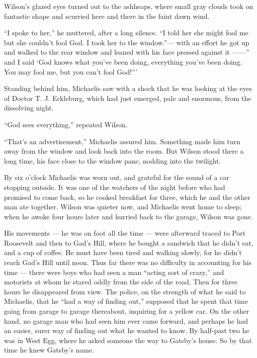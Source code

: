 \documentclass{znotebook}
\begin{document}
Wilson's glazed eyes turned out to the ashheaps, where small gray clouds took on fantastic shape and scurried here and there in the faint dawn wind.

``I spoke to her,'' he muttered, after a long silence. ``I told her she might fool me but she couldn't fool God. I took her to the window.''— with an effort he got up and walked to the rear window and leaned with his face pressed against it ——'' and I said ‘God knows what you've been doing, everything you've been doing. You may fool me, but you can't fool God!'''

Standing behind him, Michaelis saw with a shock that he was looking at the eyes of Doctor T. J. Eckleburg, which had just emerged, pale and enormous, from the dissolving night.

``God sees everything,'' repeated Wilson.

``That's an advertisement,'' Michaelis assured him. Something made him turn away from the window and look back into the room. But Wilson stood there a long time, his face close to the window pane, nodding into the twilight.

By six o'clock Michaelis was worn out, and grateful for the sound of a car stopping outside. It was one of the watchers of the night before who had promised to come back, so he cooked breakfast for three, which he and the other man ate together. Wilson was quieter now, and Michaelis went home to sleep; when he awoke four hours later and hurried back to the garage, Wilson was gone.

His movements — he was on foot all the time — were afterward traced to Port Roosevelt and then to Gad's Hill, where he bought a sandwich that he didn't eat, and a cup of coffee. He must have been tired and walking slowly, for he didn't reach Gad's Hill until noon. Thus far there was no difficulty in accounting for his time — there were boys who had seen a man ``acting sort of crazy,'' and motorists at whom he stared oddly from the side of the road. Then for three hours he disappeared from view. The police, on the strength of what he said to Michaelis, that he ``had a way of finding out,'' supposed that he spent that time going from garage to garage thereabout, inquiring for a yellow car. On the other hand, no garage man who had seen him ever came forward, and perhaps he had an easier, surer way of finding out what he wanted to know. By half-past two he was in West Egg, where he asked someone the way to Gatsby's house. So by that time he knew Gatsby's name.
\end{document}
